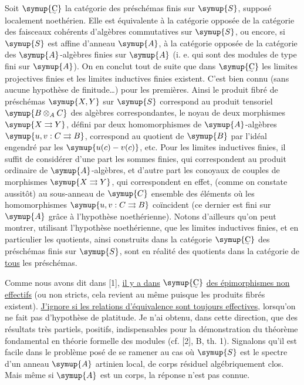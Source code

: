 Soit $\symup{\text{\uwave{C}}}$ la catégorie des préschémas finis sur $\symup{S}$, supposé
localement noethérien. Elle est équivalente à la catégorie opposée de la
catégorie des faisceaux cohérents d'algèbres commutatives sur $\symup{S}$, ou encore,
si $\symup{S}$ est affine d'anneau $\symup{A}$, à la catégorie opposée de la catégorie des
$\symup{A}$-algèbres finies sur $\symup{A}$ (i. e. qui sont des modules de type fini sur $\symup{A}$).
On en conclut tout de suite que dans $\symup{\text{\uwave{C}}}$ les limites projectives
finies et les limites inductives finies existent. C'est bien connu (sans
aucune hypothèse de finitude\ldots) pour les premières. Ainsi le produit fibré
de préschémas $\symup{X,Y}$ sur $\symup{S}$ correspond au produit tensoriel $\symup{B\otimes_A C}$
des algèbres correspondantes, le noyau de deux morphismes
$\symup{X\rightrightarrows Y}$, défini par deux homomorphismes de $\symup{A}$-algèbres
$\symup{u,v:C\rightrightarrows B}$, correspond au quotient de $\symup{B}$ par l'idéal engendré
par les $\symup{u(c)-v(c)}$, etc. Pour les limites inductives finies, il suffit de
considérer d'une part les sommes finies, qui correspondent au produit ordinaire
de $\symup{A}$-algèbres, et d'autre part les conoyaux de couples de morphismes
$\symup{X\rightrightarrows Y}$, qui correspondent en effet, (comme on constate
aussitôt) au sous-anneau de $\symup{C}$ ensemble des éléments où les homomorphismes
$\symup{u,v:C\rightrightarrows B}$ coïncident (ce dernier est fini sur $\symup{A}$ grâce à
l'hypothèse noethérienne). Notons d'ailleurs qu'on peut montrer, utilisant
l'hypothèse noethérienne, que les limites inductives finies, et en particulier
les quotients, ainsi construits dans la catégorie $\symup{\text{\uwave{C}}}$ des préschémas
finis sur $\symup{S}$, sont en réalité des quotients dans la catégorie de \uline{tous}
les préschémas.

Comme nous avons dit dans [1], \uline{il y a dans} $\symup{\text{\uwave{C}}}$ \uline{des épimorphismes non effectifs} (ou non stricts, cela revient au même puisque les produits fibrés
existent). \uline{J'ignore si les relations d'équivalence sont toujours
effectives}, lorsqu'on ne fait pas d'hypothèse de platitude. Je n'ai obtenu,
dans cette direction, que des résultats très partiels, positifs,
indispensables pour la démonstration du théorème fondamental en théorie
formelle des modules (cf. [2], B, th. 1). Signalons qu'il est facile dans le
problème posé de se ramener au cas où $\symup{S}$ est le spectre d'un anneau $\symup{A}$
artinien local, de corps résiduel algébriquement clos. Mais même si $\symup{A}$ est un
corps, la réponse n'est pas connue.

